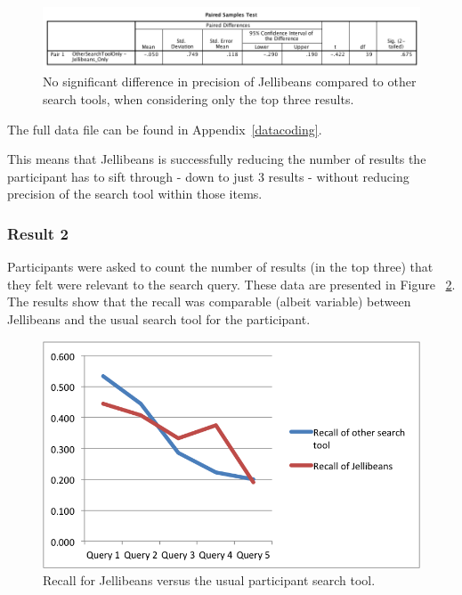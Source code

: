 \documentclass[a4paper, 11pt]{article}
\begin{document}
\begin{figure}[H]
\begin{center}
\includegraphics[scale=0.47]{Result1spss}
\caption{No significant difference in precision of Jellibeans compared to other search tools, when considering only the top three results.}
\label{result1spss}
\end{center}
\end{figure}

The full data file can be found in Appendix~\ref{datacoding}.

\vspace{5mm}
This means that Jellibeans is successfully reducing the number of results the participant has to sift through - down to just 3 results - without reducing precision of the search tool within those items.

\subsubsection{Result 2}
Participants were asked to count the number of results (in the top three) that they felt were relevant to the search query. These data are presented in Figure ~\ref{result2}. The results show that the recall was comparable (albeit variable) between Jellibeans and the usual search tool for the participant.

\begin{figure}[H]
\begin{center}
\includegraphics[scale=1]{result2}
\caption{Recall for Jellibeans versus the usual participant search tool.}
\label{result2}
\end{center}
\end{figure}
\end{document}
